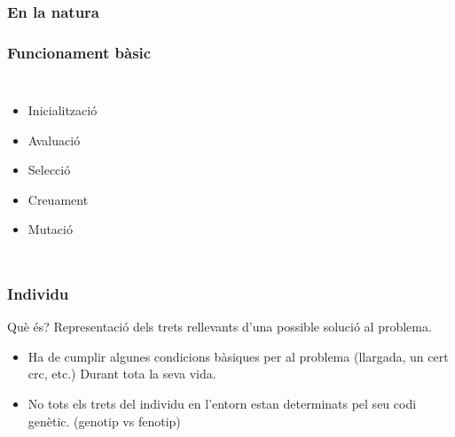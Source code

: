 \documentclass{beamer}
\begin{document}
\begin{frame}
	\frametitle{En la natura}
	\pause
\end{frame}
\begin{frame}
	\frametitle{Funcionament bàsic}
	\begin{columns}[c]
		\begin{itemize}
			\item Inicialització
			\item Avaluació
			\item Selecció
			\item Creuament
			\item Mutació
		\end{itemize}
	\end{columns}
\end{frame}

\begin{frame}
	\frametitle{Individu}
	\begin{block}{Què és?}
		Representació dels trets rellevants d'una possible solució al problema.
	 \end{block}
	\pause
	\begin{itemize}
		\item Ha de cumplir algunes condicions bàsiques per al problema (llargada, un cert crc,
			etc.) Durant tota la seva vida.
		\item No tots els trets del individu en l'entorn estan determinats pel seu codi genètic.
			(genotip vs fenotip)
	\end{itemize}
\end{frame}
\end{document}
